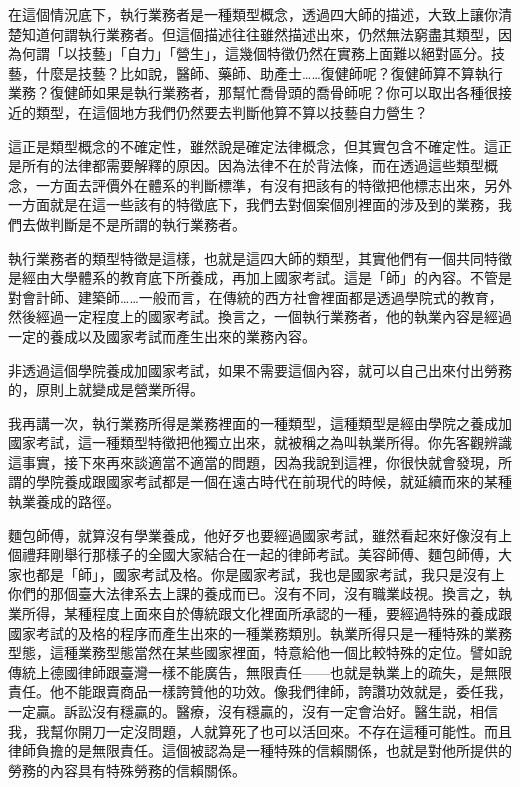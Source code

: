 \documentclass[]{ctexbook}
\begin{document}
在這個情況底下，執行業務者是一種類型概念，透過四大師的描述，大致上讓你清楚知道何謂執行業務者。但這個描述往往雖然描述出來，仍然無法窮盡其類型，因為何謂「以技藝」「自力」「營生」，這幾個特徵仍然在實務上面難以絕對區分。技藝，什麼是技藝？比如說，醫師、藥師、助產士\ldots\ldots 復健師呢？復健師算不算執行業務？復健師如果是執行業務者，那幫忙喬骨頭的喬骨師呢？你可以取出各種很接近的類型，在這個地方我們仍然要去判斷他算不算以技藝自力營生？

這正是類型概念的不確定性，雖然說是確定法律概念，但其實包含不確定性。這正是所有的法律都需要解釋的原因。因為法律不在於背法條，而在透過這些類型概念，一方面去評價外在體系的判斷標準，有沒有把該有的特徵把他標志出來，另外一方面就是在這一些該有的特徵底下，我們去對個案個別裡面的涉及到的業務，我們去做判斷是不是所謂的執行業務者。

執行業務者的類型特徵是這樣，也就是這四大師的類型，其實他們有一個共同特徵是經由大學體系的教育底下所養成，再加上國家考試。這是「師」的內容。不管是對會計師、建築師\ldots\ldots 一般而言，在傳統的西方社會裡面都是透過學院式的教育，然後經過一定程度上的國家考試。換言之，一個執行業務者，他的執業內容是經過一定的養成以及國家考試而產生出來的業務內容。

非透過這個學院養成加國家考試，如果不需要這個內容，就可以自己出來付出勞務的，原則上就變成是營業所得。

我再講一次，執行業務所得是業務裡面的一種類型，這種類型是經由學院之養成加國家考試，這一種類型特徵把他獨立出來，就被稱之為叫執業所得。你先客觀辨識這事實，接下來再來談適當不適當的問題，因為我說到這裡，你很快就會發現，所謂的學院養成跟國家考試都是一個在遠古時代在前現代的時候，就延續而來的某種執業養成的路徑。

麵包師傅，就算沒有學業養成，他好歹也要經過國家考試，雖然看起來好像沒有上個禮拜剛舉行那樣子的全國大家結合在一起的律師考試。美容師傅、麵包師傅，大家也都是「師」，國家考試及格。你是國家考試，我也是國家考試，我只是沒有上你們的那個臺大法律系去上課的養成而已。沒有不同，沒有職業歧視。換言之，執業所得，某種程度上面來自於傳統跟文化裡面所承認的一種，要經過特殊的養成跟國家考試的及格的程序而產生出來的一種業務類別。執業所得只是一種特殊的業務型態，這種業務型態當然在某些國家裡面，特意給他一個比較特殊的定位。譬如說傳統上德國律師跟臺灣一樣不能廣告，無限責任------也就是執業上的疏失，是無限責任。他不能跟賣商品一樣誇贊他的功效。像我們律師，誇讚功效就是，委任我，一定贏。訴訟沒有穩贏的。醫療，沒有穩贏的，沒有一定會治好。醫生説，相信我，我幫你開刀一定沒問題，人就算死了也可以活回來。不存在這種可能性。而且律師負擔的是無限責任。這個被認為是一種特殊的信賴關係，也就是對他所提供的勞務的內容具有特殊勞務的信賴關係。
\end{document}
